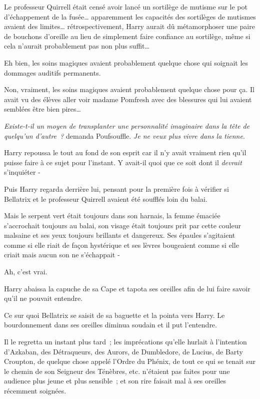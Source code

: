 Le professeur Quirrell était censé avoir lancé un sortilège de mutisme sur le pot d'échappement de la fusée… apparemment les capacités des sortilèges de mutismes avaient des limites… rétrospectivement, Harry aurait dû métamorphoser une paire de bouchons d'oreille au lieu de simplement faire confiance au sortilège, même si cela n'aurait probablement pas non plus suffit…

Eh bien, les soins magiques avaient probablement quelque chose qui soignait les dommages auditifs permanents.

Non, vraiment, les soins magiques avaient probablement quelque chose pour ça. Il avait vu des élèves aller voir madame Pomfresh avec des blessures qui lui avaient semblées être bien pires…

\emph{Existe-t-il un moyen de transplanter une personnalité imaginaire dans la tête de quelqu'un d'autre~?} demanda Poufsouffle. \emph{Je ne veux plus vivre dans la tienne}.

Harry repoussa le tout au fond de son esprit car il n'y avait vraiment rien qu'il puisse faire à ce sujet pour l'instant. Y avait-il quoi que ce soit dont il \emph{devrait} s'inquiéter -

Puis Harry regarda derrière lui, pensant pour la première fois à vérifier si Bellatrix et le professeur Quirrell avaient été soufflés loin du balai.

Mais le serpent vert était toujours dans son harnais, la femme émaciée s'accrochait toujours au balai, son visage était toujours prit par cette couleur malsaine et ses yeux toujours brillants et dangereux. Ses épaules s'agitaient comme si elle riait de façon hystérique et ses lèvres bougeaient comme si elle criait mais aucun son ne s'échappait -

Ah, c'est vrai.

Harry abaissa la capuche de sa Cape et tapota ses oreilles afin de lui faire savoir qu'il ne pouvait entendre.

Ce sur quoi Bellatrix se saisit de sa baguette et la pointa vers Harry. Le bourdonnement dans ses oreilles diminua soudain et il put l'entendre.

Il le regretta un instant plus tard~; les imprécations qu'elle hurlait à l'intention d'Azkaban, des Détraqueurs, des Aurors, de Dumbledore, de Lucius, de Barty Croupton, de quelque chose appelé l'Ordre du Phénix, de tout ce qui se tenait sur le chemin de son Seigneur des Ténèbres, etc. n'étaient pas faites pour une audience plus jeune et plus sensible~; et son rire faisait mal à ses oreilles récemment soignées.

